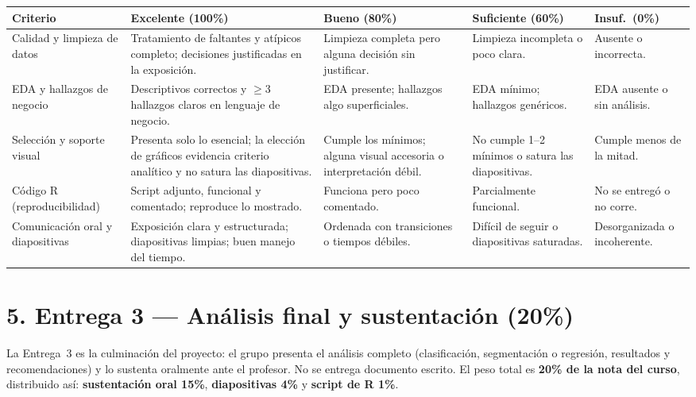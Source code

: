 \documentclass[11pt,letterpaper]{article}
\begin{document}
\begin{tabular}{L{2.6cm} L{3cm} L{2.6cm} L{2.6cm} L{2.6cm}}
  \toprule
  \textbf{Criterio} & \textbf{Excelente (100\%)} & \textbf{Bueno (80\%)} & \textbf{Suficiente (60\%)} & \textbf{Insuf.\ (0\%)} \\
  \midrule
  Calidad y limpieza de datos
    & Tratamiento de faltantes y atípicos completo; decisiones justificadas en la exposición.
    & Limpieza completa pero alguna decisión sin justificar.
    & Limpieza incompleta o poco clara.
    & Ausente o incorrecta. \\
  \addlinespace
  EDA y hallazgos de negocio
    & Descriptivos correctos y $\geq$3 hallazgos claros en lenguaje de negocio.
    & EDA presente; hallazgos algo superficiales.
    & EDA mínimo; hallazgos genéricos.
    & EDA ausente o sin análisis. \\
  \addlinespace
  Selección y soporte visual
    & Presenta solo lo esencial; la elección de gráficos evidencia criterio analítico y no satura las diapositivas.
    & Cumple los mínimos; alguna visual accesoria o interpretación débil.
    & No cumple 1--2 mínimos o satura las diapositivas.
    & Cumple menos de la mitad. \\
  \addlinespace
  Código R (reproducibilidad)
    & Script adjunto, funcional y comentado; reproduce lo mostrado.
    & Funciona pero poco comentado.
    & Parcialmente funcional.
    & No se entregó o no corre. \\
  \addlinespace
  Comunicación oral y diapositivas
    & Exposición clara y estructurada; diapositivas limpias; buen manejo del tiempo.
    & Ordenada con transiciones o tiempos débiles.
    & Difícil de seguir o diapositivas saturadas.
    & Desorganizada o incoherente. \\
  \bottomrule
\end{tabular}

\clearpage
\section{5. Entrega 3 --- Análisis final y sustentación (20\%)}

La Entrega~3 es la culminación del proyecto: el grupo presenta el análisis completo (clasificación, segmentación o regresión, resultados y recomendaciones) y lo sustenta oralmente ante el profesor. No se entrega documento escrito. El peso total es \textbf{20\% de la nota del curso}, distribuido así: \textbf{sustentación oral 15\%}, \textbf{diapositivas 4\%} y \textbf{script de R 1\%}.
\end{document}
